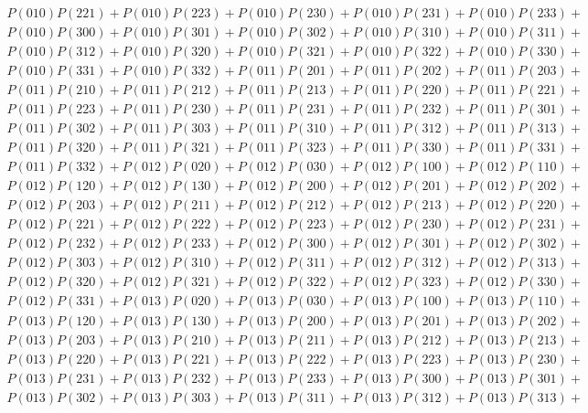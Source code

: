 \documentclass{article}
\theoremstyle{definition}
\begin{document}
\begin{gather*}
        P(010)P(221) + P(010)P(223) + P(010)P(230) + P(010)P(231) + P(010)P(233) +\\
        P(010)P(300) + P(010)P(301) + P(010)P(302) + P(010)P(310) + P(010)P(311) +\\
        P(010)P(312) + P(010)P(320) + P(010)P(321) + P(010)P(322) + P(010)P(330) +\\
        P(010)P(331) + P(010)P(332) + P(011)P(201) + P(011)P(202) + P(011)P(203) +\\
        P(011)P(210) + P(011)P(212) + P(011)P(213) + P(011)P(220) + P(011)P(221) +\\
        P(011)P(223) + P(011)P(230) + P(011)P(231) + P(011)P(232) + P(011)P(301) +\\
        P(011)P(302) + P(011)P(303) + P(011)P(310) + P(011)P(312) + P(011)P(313) +\\
        P(011)P(320) + P(011)P(321) + P(011)P(323) + P(011)P(330) + P(011)P(331) +\\
        P(011)P(332) + P(012)P(020) + P(012)P(030) + P(012)P(100) + P(012)P(110) +\\
        P(012)P(120) + P(012)P(130) + P(012)P(200) + P(012)P(201) + P(012)P(202) +\\
        P(012)P(203) + P(012)P(211) + P(012)P(212) + P(012)P(213) + P(012)P(220) +\\
        P(012)P(221) + P(012)P(222) + P(012)P(223) + P(012)P(230) + P(012)P(231) +\\
        P(012)P(232) + P(012)P(233) + P(012)P(300) + P(012)P(301) + P(012)P(302) +\\
        P(012)P(303) + P(012)P(310) + P(012)P(311) + P(012)P(312) + P(012)P(313) +\\
        P(012)P(320) + P(012)P(321) + P(012)P(322) + P(012)P(323) + P(012)P(330) +\\
        P(012)P(331) + P(013)P(020) + P(013)P(030) + P(013)P(100) + P(013)P(110) +\\
        P(013)P(120) + P(013)P(130) + P(013)P(200) + P(013)P(201) + P(013)P(202) +\\
        P(013)P(203) + P(013)P(210) + P(013)P(211) + P(013)P(212) + P(013)P(213) +\\
        P(013)P(220) + P(013)P(221) + P(013)P(222) + P(013)P(223) + P(013)P(230) +\\
        P(013)P(231) + P(013)P(232) + P(013)P(233) + P(013)P(300) + P(013)P(301) +\\
        P(013)P(302) + P(013)P(303) + P(013)P(311) + P(013)P(312) + P(013)P(313) +\\

\end{gather*}
\end{document}
